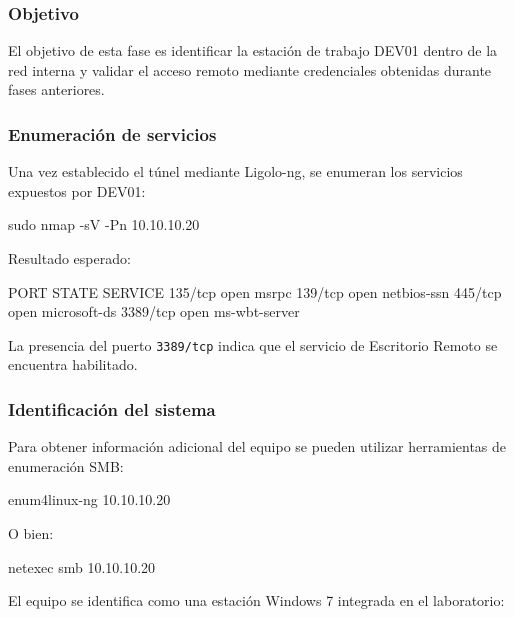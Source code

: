 

\subsubsection*{Objetivo}

El objetivo de esta fase es identificar la estación de trabajo DEV01 dentro de la red interna y validar el acceso remoto mediante credenciales obtenidas durante fases anteriores.

\subsubsection*{Enumeración de servicios}

Una vez establecido el túnel mediante Ligolo-ng, se enumeran los servicios expuestos por DEV01:

\begin{bashbox}
sudo nmap -sV -Pn 10.10.10.20
\end{bashbox}

Resultado esperado:

\begin{configbox}
PORT     STATE SERVICE
135/tcp  open  msrpc
139/tcp  open  netbios-ssn
445/tcp  open  microsoft-ds
3389/tcp open  ms-wbt-server
\end{configbox}

La presencia del puerto \texttt{3389/tcp} indica que el servicio de Escritorio Remoto se encuentra habilitado.

\subsubsection*{Identificación del sistema}

Para obtener información adicional del equipo se pueden utilizar herramientas de enumeración SMB:

\begin{bashbox}
enum4linux-ng 10.10.10.20
\end{bashbox}

O bien:

\begin{bashbox}
netexec smb 10.10.10.20
\end{bashbox}

El equipo se identifica como una estación Windows 7 integrada en el laboratorio:

